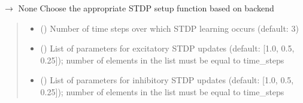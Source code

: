\documentclass[letterpaper,10pt,english]{sphinxmanual}
\begin{document}
\begin{fulllineitems}
\begin{fulllineitems}
\begin{quote}
\begin{description}
\begin{itemize}
\begin{enumerate}
\end{enumerate}


\end{itemize}

\end{description}\end{quote}

\end{fulllineitems}


\begin{fulllineitems}
\label{\detokenize{index:id6}}
\pysigstartsignatures
\pysiglinewithargsret
{}
{\sphinxparamcomma {}\sphinxparamcomma {}\sphinxparamcomma {}\sphinxparamcomma {}}
{{ $\rightarrow$ None}}
\pysigstopsignatures
\sphinxAtStartPar
Choose the appropriate STDP setup function based on backend
\begin{quote}\begin{description}
\begin{itemize}
\item {} 
\sphinxAtStartPar
{} () \textendash{} Number of time steps over which STDP learning occurs (default: 3)

\item {} 
\sphinxAtStartPar
{} () \textendash{} List of parameters for excitatory STDP updates (default: {[}1.0, 0.5, 0.25{]}); number of elements in the list must be equal to time\_steps

\item {} 
\sphinxAtStartPar
{} () \textendash{} List of parameters for inhibitory STDP updates (default: {[}1.0, 0.5, 0.25{]}); number of elements in the list must be equal to time\_steps


\end{itemize}
\end{description}
\end{quote}
\end{fulllineitems}
\end{fulllineitems}
\end{document}
